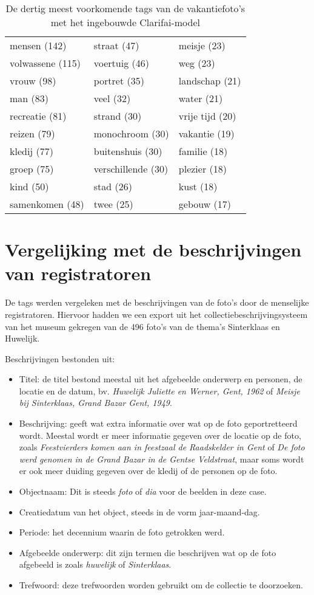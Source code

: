 \begin{table}
	\centering
	\begin{tabular}{*{3}{l}}
		mensen (142) & straat (47) & meisje (23) \\
		volwassene (115) & voertuig (46) & weg (23) \\
		vrouw (98) & portret (35) & landschap (21) \\
		man (83) & veel (32) & water (21) \\
		recreatie (81) & strand (30) & vrije tijd (20) \\
		reizen (79) & monochroom (30) & vakantie (19) \\
		kledij (77) & buitenshuis (30) & familie (18) \\
		groep (75) & verschillende (30) & plezier (18) \\
		kind (50) & stad (26) & kust (18) \\
		samenkomen (48) & twee (25) & gebouw (17) \\
	\end{tabular}
	\caption{De dertig meest voorkomende tags van de vakantiefoto's met het ingebouwde Clarifai-model}
	\label{tab:30-termen-vakantie}
\end{table}

\section{Vergelijking met de beschrijvingen van registratoren}

De tags werden vergeleken met de beschrijvingen van de foto's door de menselijke registratoren. Hiervoor hadden we een export uit het collectiebeschrijvingsysteem van het museum gekregen van de 496 foto's van de thema's Sinterklaas en Huwelijk. 

Beschrijvingen bestonden uit:
\begin{itemize}
	\item Titel: de titel bestond meestal uit het afgebeelde onderwerp en personen, de locatie en de datum, bv. \textit{Huwelijk Juliette en Werner, Gent, 1962} of \textit{Meisje bij Sinterklaas, Grand Bazar Gent, 1949}.
	\item Beschrijving: geeft wat extra informatie over wat op de foto geportretteerd wordt.  Meestal wordt er meer informatie gegeven over de locatie op de foto, zoals \textit{Feestvierders komen aan in feestzaal de Raadskelder in Gent} of \textit{De foto werd genomen in de Grand Bazar in de Gentse Veldstraat}, maar soms wordt er ook meer duiding gegeven over de kledij of de personen op de foto.
	\item Objectnaam: Dit is steeds \textit{foto} of \textit{dia} voor de beelden in deze case.
	\item Creatiedatum van het object, steeds in de vorm jaar-maand-dag.
	\item Periode: het decennium waarin de foto getrokken werd.
	\item Afgebeelde onderwerp: dit zijn termen die beschrijven wat op de foto afgebeeld is zoals \textit{huwelijk} of \textit{Sinterklaas}.
	\item Trefwoord: deze trefwoorden worden gebruikt om de collectie te doorzoeken. 
\end{itemize}

